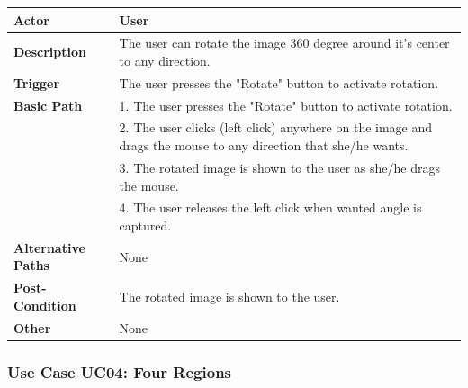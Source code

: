 \documentclass[paper=a4, fontsize=12pt]{scrartcl}	%
\numberwithin{equation}{section}		%
\numberwithin{figure}{section}			%
\numberwithin{table}{section}				%
\newcommand{\skipsubsection}[0]{\vspace{1cm}}
\begin{document}
    	\begin{center}
        	\begin{tabular}{ | p{4cm} | p{9cm} |}
            	\hline
                	\textbf{Actor} & User\\ \hline
                    \textbf{Description} & The user can rotate the image 360 degree around it's center to any direction.\\ \hline
                    \textbf{Trigger} & The user presses the "Rotate" button to activate rotation.\\ \hline
                    \textbf{Basic Path} & 1. The user presses the "Rotate" button to activate rotation.\\
                    & 2. The user clicks (left click) anywhere on the image and drags the mouse to any direction that she/he wants.\\
                    & 3. The rotated image is shown to the user as she/he drags the mouse.\\
                    & 4. The user releases the left click when wanted angle is captured.\\ \hline
                    \textbf{Alternative Paths} & None\\ \hline
                    \textbf{Post-Condition} & The rotated image is shown to the user.\\ \hline
                    \textbf{Other} & None\\
                \hline
            \end{tabular}
        \end{center}
    \skipsubsection
    
    \subsubsection{Use Case UC04: Four Regions}
    \begin{center}
    \end{center}
    
\end{document}
